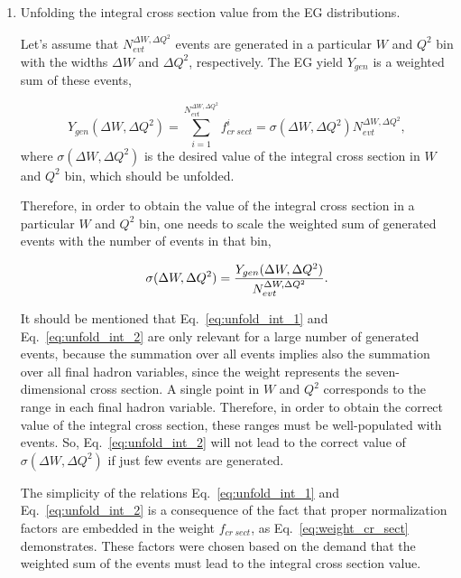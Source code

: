 \begin{enumerate}

\item Unfolding the integral cross section value from the EG distributions.

Let's assume that $N_{evt}^{\Delta W,\Delta Q^2}$ events are generated in a particular $W$ and $Q^2$ bin with the widths $\Delta W$ and $\Delta Q^2$, respectively. The EG yield $Y_{gen}$ is a weighted sum of these events,%

\begin{equation}
Y_{gen} (\Delta W,\Delta Q^2)= \sum_{i=1}^{N_{evt}^{\Delta W,\Delta Q^2}} f_{cr~sect}^{i}  = \sigma(\Delta W,\Delta Q^2)N_{evt}^{\Delta W,\Delta Q^2},
\label{eq:unfold_int_1}
\end{equation}
where $\sigma(\Delta W,\Delta Q^2)$ is the desired value of the integral cross section in $W$ and $Q^2$ bin, which should be unfolded.

Therefore, in order to obtain the value of the integral cross section in a particular $W$ and $Q^2$ bin, one needs to scale the weighted sum of generated events with the number of events in that bin,

\begin{equation}
\sigma(\Delta W,\Delta Q^2)=\frac{Y_{gen} (\Delta W,\Delta Q^2)}{N_{evt}^{\Delta W,\Delta Q^2}}.\\
\label{eq:unfold_int_2}
\end{equation}



It should be mentioned that Eq.~\eqref{eq:unfold_int_1} and Eq.~\eqref{eq:unfold_int_2} are only relevant for a large number of generated events, because the summation over all events implies also the summation over all final hadron variables, since the weight represents the seven-dimensional cross section. A single point in $W$ and $Q^2$ corresponds to the range in each final hadron variable. Therefore, in order to obtain the correct value of the integral cross section, these ranges must be well-populated with events. So,  Eq.~\eqref{eq:unfold_int_2} will not lead to the correct value of $\sigma(\Delta W,\Delta Q^2)$ if just few events are generated.

The simplicity of the relations Eq.~\eqref{eq:unfold_int_1} and Eq.~\eqref{eq:unfold_int_2} is a consequence of the fact that proper normalization factors are embedded in the weight $f_{cr~sect}$, as Eq.~\eqref{eq:weight_cr_sect} demonstrates. These factors were chosen based on the demand that the weighted sum of the events must lead to  the integral cross section value. 



\end{enumerate}
